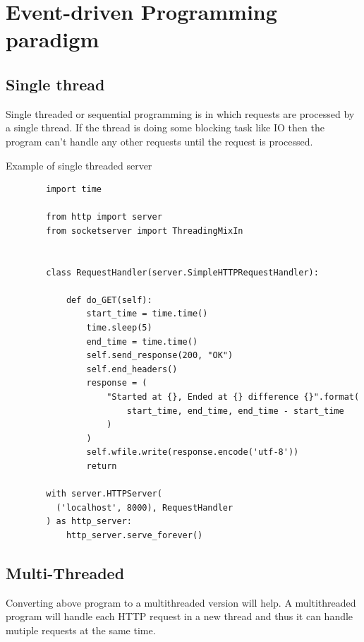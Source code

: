 \documentclass{article}
\begin{document}
  \section{Event-driven Programming paradigm}
    \subsection{Single thread}
      Single threaded or sequential programming is in which requests are
      processed by a single thread. If the thread is doing some blocking task
      like IO then the program can't handle any other requests until the
      request is processed.

      Example of single threaded server
      \begin{verbatim}
        import time

        from http import server
        from socketserver import ThreadingMixIn


        class RequestHandler(server.SimpleHTTPRequestHandler):

            def do_GET(self):
                start_time = time.time()
                time.sleep(5)
                end_time = time.time()
                self.send_response(200, "OK")
                self.end_headers()
                response = (
                    "Started at {}, Ended at {} difference {}".format(
                        start_time, end_time, end_time - start_time
                    )
                )
                self.wfile.write(response.encode('utf-8'))
                return

        with server.HTTPServer(
          ('localhost', 8000), RequestHandler
        ) as http_server:
            http_server.serve_forever()
      \end{verbatim}

    \subsection{Multi-Threaded}
      Converting above program to a multithreaded version will help. A
      multithreaded program will handle each HTTP request in a new thread and
      thus it can handle mutiple requests at the same time.
\end{document}
